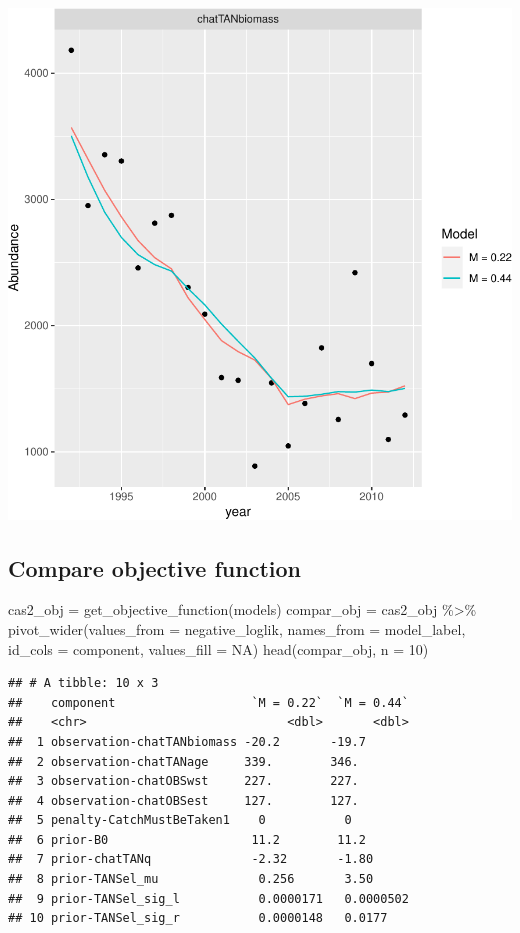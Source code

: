 \documentclass[
]{book}
\newenvironment{Shaded}{\begin{snugshade}}{\end{snugshade}}
\newcommand{\AttributeTok}[1]{\textcolor[rgb]{0.77,0.63,0.00}{#1}}
\newcommand{\ConstantTok}[1]{\textcolor[rgb]{0.00,0.00,0.00}{#1}}
\newcommand{\DecValTok}[1]{\textcolor[rgb]{0.00,0.00,0.81}{#1}}
\newcommand{\FunctionTok}[1]{\textcolor[rgb]{0.00,0.00,0.00}{#1}}
\newcommand{\NormalTok}[1]{#1}
\newcommand{\OtherTok}[1]{\textcolor[rgb]{0.56,0.35,0.01}{#1}}
\newcommand{\SpecialCharTok}[1]{\textcolor[rgb]{0.00,0.00,0.00}{#1}}
\begin{document}
\includegraphics{_main_files/figure-latex/compare_abundance-1.pdf}

\hypertarget{compare-objective-function}{%
\subsection{Compare objective function}\label{compare-objective-function}}

\begin{Shaded}
\begin{Highlighting}[]
\NormalTok{cas2\_obj }\OtherTok{=} \FunctionTok{get\_objective\_function}\NormalTok{(models)}
\NormalTok{compar\_obj }\OtherTok{=}\NormalTok{ cas2\_obj }\SpecialCharTok{\%\textgreater{}\%} \FunctionTok{pivot\_wider}\NormalTok{(}\AttributeTok{values\_from =}\NormalTok{ negative\_loglik, }\AttributeTok{names\_from =}\NormalTok{ model\_label, }\AttributeTok{id\_cols =}\NormalTok{ component, }\AttributeTok{values\_fill =} \ConstantTok{NA}\NormalTok{)}
\FunctionTok{head}\NormalTok{(compar\_obj, }\AttributeTok{n =} \DecValTok{10}\NormalTok{)}
\end{Highlighting}
\end{Shaded}

\begin{verbatim}
## # A tibble: 10 x 3
##    component                   `M = 0.22`  `M = 0.44`
##    <chr>                            <dbl>       <dbl>
##  1 observation-chatTANbiomass -20.2       -19.7      
##  2 observation-chatTANage     339.        346.       
##  3 observation-chatOBSwst     227.        227.       
##  4 observation-chatOBSest     127.        127.       
##  5 penalty-CatchMustBeTaken1    0           0        
##  6 prior-B0                    11.2        11.2      
##  7 prior-chatTANq              -2.32       -1.80     
##  8 prior-TANSel_mu              0.256       3.50     
##  9 prior-TANSel_sig_l           0.0000171   0.0000502
## 10 prior-TANSel_sig_r           0.0000148   0.0177
\end{verbatim}
\end{document}

